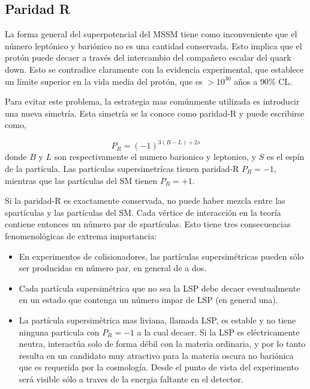 

\subsection{Paridad R}

La forma general del superpotencial del MSSM tiene como inconveniente que el
número leptónico y bariónico no es una cantidad conservada. Esto implica que el
protón puede decaer a través del intercambio del compañero escalar del quark
down. Esto se contradice claramente con la evidencia experimental, que establece
un límite superior en la vida media del protón, que es $> 10^{30}$ a\~nos a $90\%$ CL\cite{PDG}.

Para evitar este problema, la estrategia mas comúnmente utilizada es introducir
una nueva simetría. Esta simetría se la conoce como paridad-R y puede escribirse
como,

\begin{equation}
  P_R = (-1)^{3(B-L)+ 2s}
\end{equation}
%
donde $B$ y $L$ son respectivamente el numero barionico y leptonico, y $S$ es el
espín de la partícula. Las partículas supersimetrícas tienen paridad-R $P_R = -1$, mientras
que las partículas del SM tienen $P_R = +1$.

Si la paridad-R es exactamente conservada, no puede haber mezcla entre las
spartículas y las partículas del SM. Cada vértice de interacción en la
teoría contiene entonces un número par de spartículas. Esto tiene tres consecuencias
fenomenológicas de extrema importancia:

\begin{itemize}
\item En experimentos de colisionadores, las partículas supersimétricas pueden
  sólo ser producidas en número par, en general de a dos.
\item Cada partícula supersimétrica que no sea la LSP debe decaer eventualmente
  en un estado que contenga un número impar de LSP (en general una).
\item La partícula supersimétrica mas liviana, llamada LSP, es estable y no tiene
  ninguna particula con $P_R = -1$ a la cual decaer. Si
  la LSP es eléctricamente neutra, interactúa solo de forma débil con la materia
  ordinaria, y por lo tanto resulta en un candidato muy atractivo para la
  materia oscura no bariónica que es requerida por la cosmología. Desde el punto de
  vista del experimento será visible sólo a traves de la energia faltante en el detector.
\end{itemize}



